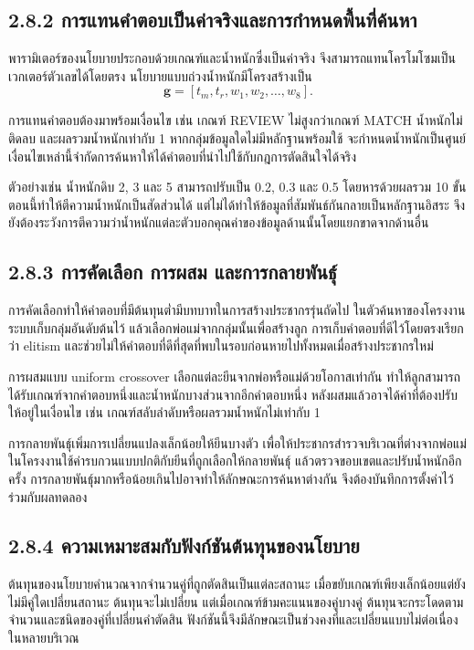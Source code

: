 \documentclass[12pt,a4paper]{report}
\begin{document}
\subsection*{2.8.2 การแทนคำตอบเป็นค่าจริงและการกำหนดพื้นที่ค้นหา}
พารามิเตอร์ของนโยบายประกอบด้วยเกณฑ์และน้ำหนักซึ่งเป็นค่าจริง จึงสามารถแทนโครโมโซมเป็นเวกเตอร์ตัวเลขได้โดยตรง นโยบายแบบถ่วงน้ำหนักมีโครงสร้างเป็น
\begin{equation*}
\boldsymbol{g}=[t_m,t_r,w_1,w_2,\ldots,w_8].
\end{equation*}

การแทนคำตอบต้องมาพร้อมเงื่อนไข เช่น เกณฑ์ REVIEW ไม่สูงกว่าเกณฑ์ MATCH น้ำหนักไม่ติดลบ และผลรวมน้ำหนักเท่ากับ 1 หากกลุ่มข้อมูลใดไม่มีหลักฐานพร้อมใช้ จะกำหนดน้ำหนักเป็นศูนย์ เงื่อนไขเหล่านี้จำกัดการค้นหาให้ได้คำตอบที่นำไปใช้กับกฎการตัดสินใจได้จริง

ตัวอย่างเช่น น้ำหนักดิบ 2, 3 และ 5 สามารถปรับเป็น 0.2, 0.3 และ 0.5 โดยหารด้วยผลรวม 10 ขั้นตอนนี้ทำให้ตีความน้ำหนักเป็นสัดส่วนได้ แต่ไม่ได้ทำให้ข้อมูลที่สัมพันธ์กันกลายเป็นหลักฐานอิสระ จึงยังต้องระวังการตีความว่าน้ำหนักแต่ละตัวบอกคุณค่าของข้อมูลด้านนั้นโดยแยกขาดจากด้านอื่น

\subsection*{2.8.3 การคัดเลือก การผสม และการกลายพันธุ์}
การคัดเลือกทำให้คำตอบที่มีต้นทุนต่ำมีบทบาทในการสร้างประชากรรุ่นถัดไป ในตัวค้นหาของโครงงาน ระบบเก็บกลุ่มอันดับต้นไว้ แล้วเลือกพ่อแม่จากกลุ่มนั้นเพื่อสร้างลูก การเก็บคำตอบที่ดีไว้โดยตรงเรียกว่า elitism และช่วยไม่ให้คำตอบที่ดีที่สุดที่พบในรอบก่อนหายไปทั้งหมดเมื่อสร้างประชากรใหม่

การผสมแบบ uniform crossover เลือกแต่ละยีนจากพ่อหรือแม่ด้วยโอกาสเท่ากัน ทำให้ลูกสามารถได้รับเกณฑ์จากคำตอบหนึ่งและน้ำหนักบางส่วนจากอีกคำตอบหนึ่ง หลังผสมแล้วอาจได้ค่าที่ต้องปรับให้อยู่ในเงื่อนไข เช่น เกณฑ์สลับลำดับหรือผลรวมน้ำหนักไม่เท่ากับ 1

การกลายพันธุ์เพิ่มการเปลี่ยนแปลงเล็กน้อยให้ยีนบางตัว เพื่อให้ประชากรสำรวจบริเวณที่ต่างจากพ่อแม่ ในโครงงานใช้ค่ารบกวนแบบปกติกับยีนที่ถูกเลือกให้กลายพันธุ์ แล้วตรวจขอบเขตและปรับน้ำหนักอีกครั้ง การกลายพันธุ์มากหรือน้อยเกินไปอาจทำให้ลักษณะการค้นหาต่างกัน จึงต้องบันทึกการตั้งค่าไว้ร่วมกับผลทดลอง

\subsection*{2.8.4 ความเหมาะสมกับฟังก์ชันต้นทุนของนโยบาย}
ต้นทุนของนโยบายคำนวณจากจำนวนคู่ที่ถูกตัดสินเป็นแต่ละสถานะ เมื่อขยับเกณฑ์เพียงเล็กน้อยแต่ยังไม่มีคู่ใดเปลี่ยนสถานะ ต้นทุนจะไม่เปลี่ยน แต่เมื่อเกณฑ์ข้ามคะแนนของคู่บางคู่ ต้นทุนจะกระโดดตามจำนวนและชนิดของคู่ที่เปลี่ยนคำตัดสิน ฟังก์ชันนี้จึงมีลักษณะเป็นช่วงคงที่และเปลี่ยนแบบไม่ต่อเนื่องในหลายบริเวณ
\end{document}
